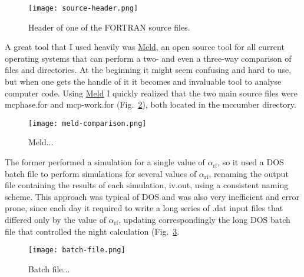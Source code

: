 \begin{figure}[tb]
	\centering
	\texttt{[image: source-header.png]}
	\caption{Header of one of the FORTRAN source files.}
	\label{fig:source-header}
\end{figure}


A great tool that I used heavily was \href{http://meldmerge.org/}{Meld}, an open source tool for all current operating systems that can perform a two- and even a three-way comparison of files and directories. At the beginning it might seem confusing and hard to use, but when one gets the handle of it it becomes and invaluable tool to analyse computer code. Using \href{http://meldmerge.org/}{Meld} I quickly realized that the two main source files were \textsf{mcphase.for} and \textsf{mcp-work.for} (Fig.~\ref{fig:meld-comparison}), both located in the \textsf{mccumber} directory.

\begin{figure}[bt]
	\centering
	\texttt{[image: meld-comparison.png]}
	\caption{Meld...}
	\label{fig:meld-comparison}
\end{figure}


The former performed a simulation for a single value of $\alpha_\mathrm{rf}$, so it used a DOS batch file to perform simulations for several values of $\alpha_\mathrm{rf}$, renaming the output file containing the results of each simulation, \textsf{iv.out}, using a consistent naming scheme.
This approach was typical of DOS and was also very inefficient and error prone, since each day it required to write a long series of \textsf{.dat} input files that differed only by the value of $\alpha_\mathrm{rf}$, updating correspondingly the long DOS batch file that controlled the night calculation (Fig.~\ref{fig:batch-file}.

\begin{figure}[tbh]
	\centering
	\texttt{[image: batch-file.png]}
	\caption{Batch file...}
	\label{fig:batch-file}
\end{figure}


